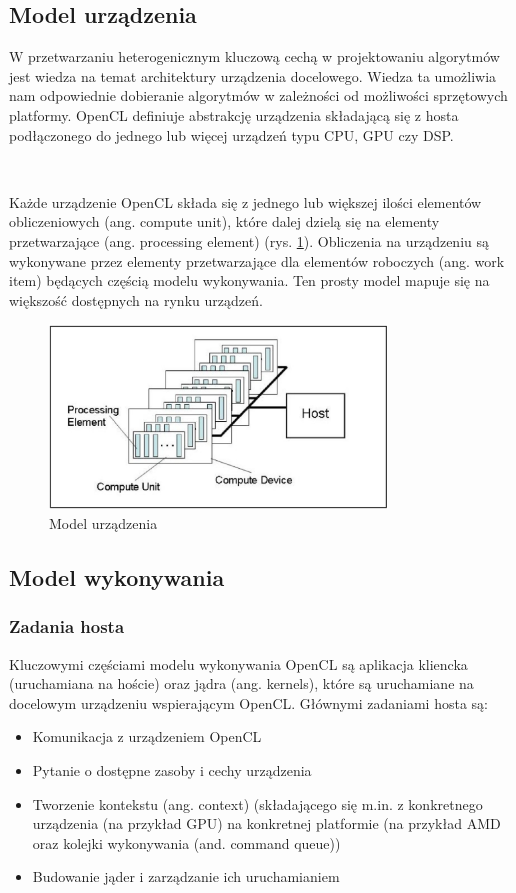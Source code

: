 \documentclass[polish, 12pt]{aghthesis}
\begin{document}
	\subsection{Model urządzenia}
	
	W przetwarzaniu heterogenicznym kluczową cechą w projektowaniu algorytmów jest wiedza na temat architektury urządzenia docelowego. Wiedza ta umożliwia nam odpowiednie dobieranie algorytmów w zależności od możliwości sprzętowych platformy. OpenCL definiuje abstrakcję urządzenia składającą się z hosta podłączonego do jednego lub więcej urządzeń typu CPU, GPU czy DSP.
	
	$\,$
	
	Każde urządzenie OpenCL składa się z jednego lub większej ilości elementów obliczeniowych (ang. compute unit), które dalej dzielą się na elementy przetwarzające (ang. processing element) (rys. \ref{fig:model}). Obliczenia na urządzeniu są wykonywane przez elementy przetwarzające dla elementów roboczych (ang. work item) będących częścią modelu wykonywania. Ten prosty model mapuje się na większość dostępnych na rynku urządzeń.
	
	
	\begin{figure}[h!]
    \centering
    \includegraphics[width=0.8\textwidth]{PlatformModel.jpg}
    \caption{Model urządzenia}
    \label{fig:model}
	\end{figure}
	
	\subsection{Model wykonywania}
	
	\subsubsection{Zadania hosta}
	Kluczowymi częściami modelu wykonywania OpenCL są aplikacja kliencka (uruchamiana na hoście) oraz jądra (ang. kernels), które są uruchamiane na docelowym urządzeniu wspierającym OpenCL. Głównymi zadaniami hosta są:
	\begin{itemize} 
	\item Komunikacja z urządzeniem OpenCL
	\item Pytanie o dostępne zasoby i cechy urządzenia
	\item Tworzenie kontekstu (ang. context) (składającego się m.in. z konkretnego urządzenia (na przykład GPU) na konkretnej platformie (na przykład AMD oraz kolejki wykonywania (and. command queue))
	\item Budowanie jąder i zarządzanie ich uruchamianiem
	\end{itemize}
	
\end{document}
